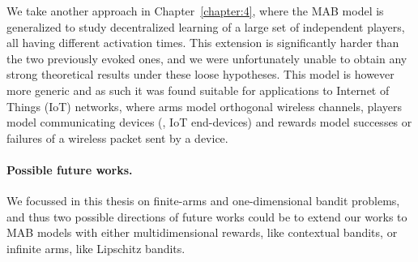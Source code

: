 We take another approach in Chapter~\ref{chapter:4}, where the MAB model is generalized to study decentralized learning of a large set of independent players, all having different activation times.
This extension is significantly harder than the two previously evoked ones, and we were unfortunately unable to obtain any strong theoretical results under these loose hypotheses.
This model is however more generic and as such it was found suitable for applications to Internet of Things (IoT) networks, where arms model orthogonal wireless channels, players model communicating devices (\ie, IoT end-devices) and rewards model successes or failures of a wireless packet sent by a device.


\paragraph{Possible future works.}
%
We focussed in this thesis on finite-arms and one-dimensional bandit problems,
and thus two possible directions of future works could be to extend our works
to MAB models with either multidimensional rewards, like contextual bandits, or infinite arms, like Lipschitz bandits.









